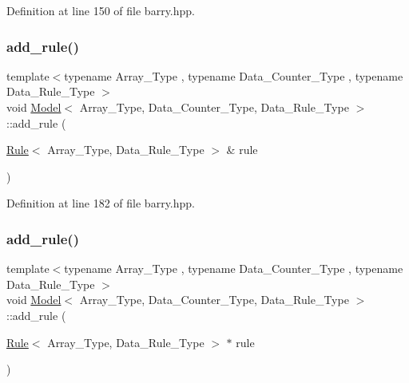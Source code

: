 Definition at line 150 of file barry.\+hpp.

\mbox{\label{classbarry_1_1_model_af2c3f6300b90e6a2a4deaebaf2b0e732}} 
\subsubsection{\texorpdfstring{add\+\_\+rule()}{add\_rule()}\hspace{0.1cm}{\footnotesize\ttfamily [1/3]}}
{\footnotesize\ttfamily template$<$typename Array\+\_\+\+Type , typename Data\+\_\+\+Counter\+\_\+\+Type , typename Data\+\_\+\+Rule\+\_\+\+Type $>$ \\
void \hyperlink{classbarry_1_1_model}{Model}$<$ Array\+\_\+\+Type, Data\+\_\+\+Counter\+\_\+\+Type, Data\+\_\+\+Rule\+\_\+\+Type $>$\+::add\+\_\+rule (\begin{DoxyParamCaption}\item[{\hyperlink{classbarry_1_1_rule}{Rule}$<$ Array\+\_\+\+Type, Data\+\_\+\+Rule\+\_\+\+Type $>$ \&}]{rule }\end{DoxyParamCaption})\hspace{0.3cm}{\ttfamily [inline]}}



Definition at line 182 of file barry.\+hpp.

\mbox{\label{classbarry_1_1_model_aba5b01457e2f624766a72ba15b8cb6be}} 
\subsubsection{\texorpdfstring{add\+\_\+rule()}{add\_rule()}\hspace{0.1cm}{\footnotesize\ttfamily [2/3]}}
{\footnotesize\ttfamily template$<$typename Array\+\_\+\+Type , typename Data\+\_\+\+Counter\+\_\+\+Type , typename Data\+\_\+\+Rule\+\_\+\+Type $>$ \\
void \hyperlink{classbarry_1_1_model}{Model}$<$ Array\+\_\+\+Type, Data\+\_\+\+Counter\+\_\+\+Type, Data\+\_\+\+Rule\+\_\+\+Type $>$\+::add\+\_\+rule (\begin{DoxyParamCaption}\item[{\hyperlink{classbarry_1_1_rule}{Rule}$<$ Array\+\_\+\+Type, Data\+\_\+\+Rule\+\_\+\+Type $>$ $\ast$}]{rule }\end{DoxyParamCaption})\hspace{0.3cm}{\ttfamily [inline]}}



